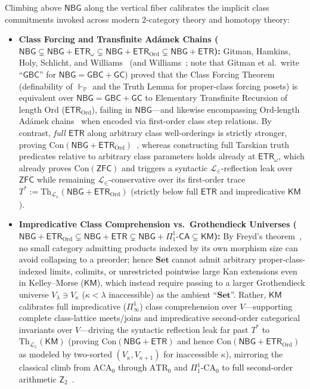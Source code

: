 Climbing above $\mathsf{NBG}$ along the vertical fiber calibrates the implicit class commitments invoked across modern $2$-category theory and homotopy theory:
\begin{itemize}[leftmargin=1.5em]
  \item \textbf{Class Forcing and Transfinite Ad\'amek Chains ($\mathsf{NBG} \subsetneq \mathsf{NBG} + \mathsf{ETR}_\omega \subsetneq \mathsf{NBG} + \mathsf{ETR}_{\mathrm{Ord}} \subsetneq \mathsf{NBG} + \mathsf{ETR}$):} Gitman, Hamkins, Holy, Schlicht, and Williams~\cite[Thm.~1.2]{Gitman20} (and Williams~\cite{Williams18}; note that Gitman et al.\ write ``$\mathsf{GBC}$'' for $\mathsf{NBG} = \mathsf{GBC} + \mathsf{GC}$) proved that the Class Forcing Theorem (definability of $\Vdash_{\mathbb{P}}$ and the Truth Lemma for proper-class forcing posets) is equivalent over $\mathsf{NBG} = \mathsf{GBC} + \mathsf{GC}$ to Elementary Transfinite Recursion of length $\mathrm{Ord}$ ($\mathsf{ETR}_{\mathrm{Ord}}$), failing in $\mathsf{NBG}$---and likewise encompassing $\mathrm{Ord}$-length Ad\'amek chains~\cite{Goldthorpe23} when encoded via first-order class step relations. By contrast, \emph{full $\mathsf{ETR}$} along arbitrary class well-orderings is strictly stronger, proving $\mathrm{Con}(\mathsf{NBG} + \mathsf{ETR}_{\mathrm{Ord}})$~\cite{Gitman20}, whereas constructing full Tarskian truth predicates relative to arbitrary class parameters holds already at $\mathsf{ETR}_\omega$, which already proves $\mathrm{Con}(\mathsf{ZFC})$ and triggers a syntactic $\mathcal{L}_\in$-reflection leak over $\mathsf{ZFC}$ while remaining $\mathcal{L}_\in$-conservative over its first-order trace $T^* := \mathrm{Th}_{\mathcal{L}_\in}(\mathsf{NBG} + \mathsf{ETR}_{\mathrm{Ord}})$ (strictly below full $\mathsf{ETR}$ and impredicative $\mathsf{KM}$).
  \item \textbf{Impredicative Class Comprehension vs.\ Grothendieck Universes ($\mathsf{NBG} + \mathsf{ETR}_{\mathrm{Ord}} \subsetneq \mathsf{NBG} + \mathsf{ETR} \subsetneq \mathsf{NBG} + \Pi^1_1\text{-}\mathsf{CA} \subsetneq \mathsf{KM}$):} By Freyd's theorem~\cite[Ch.~V, \S 2, Prop.~3]{MacLane98}, no small category admitting products indexed by its own morphism size can avoid collapsing to a preorder; hence $\mathbf{Set}$ cannot admit arbitrary proper-class-indexed limits, colimits, or unrestricted pointwise large Kan extensions even in Kelley--Morse ($\mathsf{KM}$), which instead require passing to a larger Grothendieck universe $V_\lambda \ni V_\kappa$ ($\kappa < \lambda$ inaccessible) as the ambient ``$\mathbf{Set}$''. Rather, $\mathsf{KM}$ calibrates full impredicative ($\Pi^1_\infty$) class comprehension over $V$---supporting complete class-lattice meets/joins and impredicative second-order categorical invariants over $V$---driving the syntactic reflection leak far past $T^*$ to $\mathrm{Th}_{\mathcal{L}_\in}(\mathsf{KM})$ (proving $\mathrm{Con}(\mathsf{NBG} + \mathsf{ETR})$ and hence $\mathrm{Con}(\mathsf{NBG} + \mathsf{ETR}_{\mathrm{Ord}})$ as modeled by two-sorted $(V_\kappa, V_{\kappa+1})$ for inaccessible $\kappa$), mirroring the classical climb from $\mathrm{ACA}_0$ through $\mathrm{ATR}_0$ and $\Pi^1_1\text{-}\mathrm{CA}_0$ to full second-order arithmetic $\mathsf{Z}_2$~\cite{Simpson09}.

\end{itemize}
